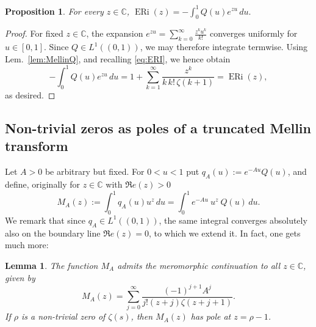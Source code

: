 \documentclass[a4paper,10pt]{amsart}
\DeclareMathOperator{\ERi}{ERi}
\newcommand{\C}{\mathbb C}
\newtheorem{lemma}[equation]{Lemma}
\newtheorem{proposition}[equation]{Proposition}
\theoremstyle{definition}
\numberwithin{equation}{section}
\def\C{\mathbb C}
\begin{document}
\begin{proposition}\label{prop:kernel}
For every $z\in\C$, $\ERi(z)=-\int_0^1Q(u)e^{zu}\,du.$
\end{proposition}

\begin{proof}
For fixed $z\in\mathbb C$, the expansion $e^{zu}=\sum_{k=0}^{\infty}\frac{z^k u^k}{k!}$ converges uniformly for $u\in[0,1]$. Since $Q\in L^1((0,1))$, we may therefore integrate termwise. Using Lem.\ \ref{lem:MellinQ}, and recalling \eqref{eq:ERI}, we hence obtain
$$
-\int_0^1Q(u)e^{zu}\,du = 1+\sum_{k=1}^{\infty} \frac{z^k}{k\,k!\,\zeta(k+1)}=\ERi(z),
$$
as desired.
\end{proof}

\subsection{Non-trivial zeros as poles of a truncated Mellin transform}
Let $A>0$ be arbitrary but fixed. For $0<u<1$ put $q_A(u):=e^{-Au}Q(u)$, and define, originally for $z\in\C$ with $\Re e(z)>0$
$$
M_A(z):=\int_0^1q_A(u)u^z\,du = \int_0^1e^{-Au} \ u^z \ Q(u)\,du.
$$
We remark that since $q_A\in L^1((0,1))$, the same integral converges absolutely also on the boundary line $\Re e(z)=0$, to which we extend it. In fact, one gets much more:

\begin{lemma}\label{lem:MA}
The function $M_A$ admits the meromorphic continuation to all $z\in\C$, given by
\begin{equation}\label{eq:MA}
M_A(z)= \sum_{j=0}^{\infty} \frac{(-1)^{j+1}A^j}{j!(z+j)\zeta(z+j+1)}.
\end{equation}
If $\rho$ is a non-trivial zero of $\zeta(s)$, then $M_A(z)$ has pole at $z=\rho-1$.
\end{lemma}
\end{document}
